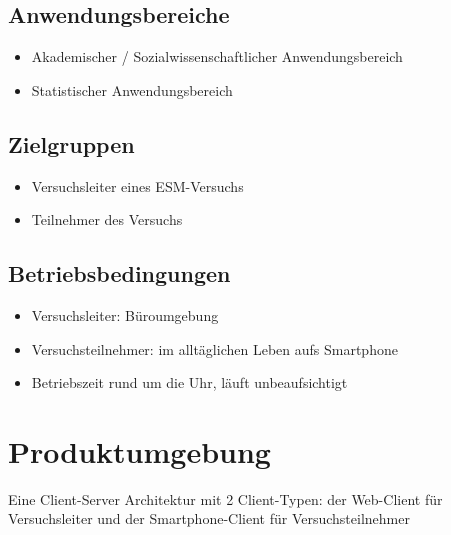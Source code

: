 \documentclass[a4paper]{scrreprt}
\begin{document}
        \section{Anwendungsbereiche}
            \begin{itemize}
                \item Akademischer / Sozialwissenschaftlicher Anwendungsbereich
                \item Statistischer Anwendungsbereich
            \end{itemize}
 
        \section{Zielgruppen}
            \begin{itemize}
                \item Versuchsleiter eines ESM-Versuchs
                \item Teilnehmer des Versuchs
            \end{itemize}
 
        \section{Betriebsbedingungen}
            \begin{itemize}
                \item Versuchsleiter: Büroumgebung
                \item Versuchsteilnehmer: im alltäglichen Leben aufs Smartphone
                \item Betriebszeit rund um die Uhr, läuft unbeaufsichtigt
            \end{itemize}
 
    \chapter{Produktumgebung}
        Eine Client-Server Architektur mit 2 Client-Typen: der Web-Client für Versuchsleiter und der Smartphone-Client für Versuchsteilnehmer
\end{document}
